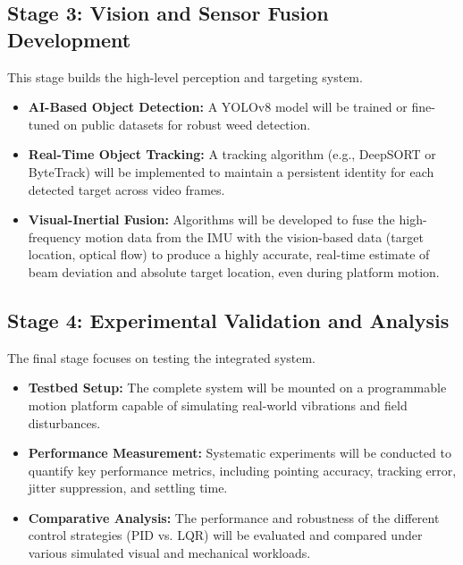\documentclass[12pt]{article}
\begin{document}
\subsection{Stage 3: Vision and Sensor Fusion Development}
This stage builds the high-level perception and targeting system.
\begin{itemize}
    \item \textbf{AI-Based Object Detection:} A YOLOv8 model will be trained or fine-tuned on public datasets for robust weed detection.
    \item \textbf{Real-Time Object Tracking:} A tracking algorithm (e.g., DeepSORT or ByteTrack) will be implemented to maintain a persistent identity for each detected target across video frames.
    \item \textbf{Visual-Inertial Fusion:} Algorithms will be developed to fuse the high-frequency motion data from the IMU with the vision-based data (target location, optical flow) to produce a highly accurate, real-time estimate of beam deviation and absolute target location, even during platform motion.
\end{itemize}

\subsection{Stage 4: Experimental Validation and Analysis}
The final stage focuses on testing the integrated system.
\begin{itemize}
    \item \textbf{Testbed Setup:} The complete system will be mounted on a programmable motion platform capable of simulating real-world vibrations and field disturbances.
    \item \textbf{Performance Measurement:} Systematic experiments will be conducted to quantify key performance metrics, including pointing accuracy, tracking error, jitter suppression, and settling time.
    \item \textbf{Comparative Analysis:} The performance and robustness of the different control strategies (PID vs. LQR) will be evaluated and compared under various simulated visual and mechanical workloads.
\end{itemize}

\newpage
\end{document}
